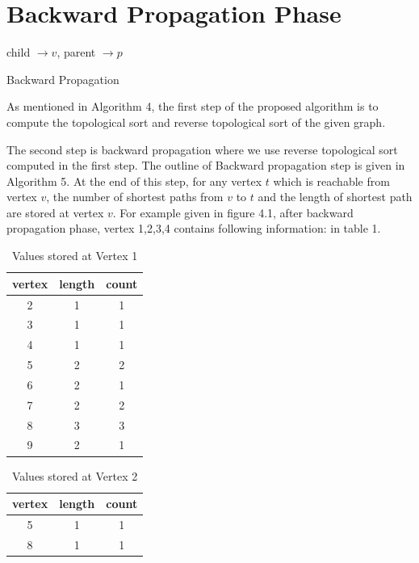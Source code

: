 \section{Backward Propagation Phase}
\begin{algorithm}
child $\rightarrow v$, parent $\rightarrow p$ \\
\caption{Backward Propagation}
\end{algorithm}
As mentioned in Algorithm 4, the first step of the proposed algorithm is to compute the topological sort and reverse topological sort of the given graph.

The second step is backward propagation where we use reverse topological sort computed in the first step. The outline of Backward propagation step is given in Algorithm 5. At the end of this step, for any vertex $t$ which is reachable from vertex $v$, the number of shortest paths from $v$ to $t$ and the length of shortest path are stored at vertex $v$. 
For example given in figure 4.1, after backward propagation phase, vertex 1,2,3,4 contains following information: in table 1.


\begin{table}[h!]
\centering
\begin{tabular}{|c|c|c|}
\hline
vertex & length & count \\
\hline
2 & 1 & 1 \\ 
\hline
3 & 1 & 1 \\ 
\hline
4 & 1 & 1 \\ 
\hline
5 & 2 & 2 \\ 
\hline
6 & 2 & 1 \\ 
\hline
7 & 2 & 2 \\ 
\hline
8 & 3 & 3 \\ 
\hline
9 & 2 & 1 \\ 
\hline
\end{tabular}
\caption{Values stored at Vertex 1}
\label{tab:data1}
\end{table}

    \begin{table}[h!]
    \centering
        \begin{tabular}{|c|c|c|}
            \hline
            vertex & length & count \\
            \hline
            5 & 1 & 1 \\ 
            \hline
            8 & 1 & 1 \\ 
            \hline
        \end{tabular}
    \caption{Values stored at Vertex 2}
    \label{tab:data2}
    \end{table}


